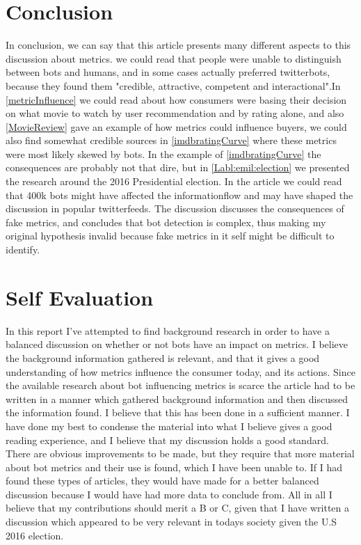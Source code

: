 \section{Conclusion}
In conclusion, we can say that this article presents many different aspects to this discussion about metrics. we could read that people were unable to distinguish between bots and humans, and in some cases actually preferred twitterbots, because they found them "credible, attractive, competent and interactional"\cite{Edwards2014372}.In \ref{metricInfluence} we could read about how consumers were basing their decision on what movie to watch by user recommendation and by rating alone, and also \ref{MovieReview} gave an example of how metrics could influence buyers, we could also find somewhat credible sources in \ref{imdbratingCurve} where these metrics were most likely skewed by bots. In the example of \ref{imdbratingCurve} the consequences are probably not that dire, but in \ref{Labl:emil:election} we presented the research around the 2016 Presidential election. In the article we could read that 400k bots might have affected the informationflow and may have shaped the discussion in popular twitterfeeds. The discussion discusses the consequences of fake metrics, and concludes that bot detection is complex, thus making my original hypothesis invalid because fake metrics in it self might be difficult to identify. 



\section*{Self Evaluation}
In this report I've attempted to find background research in order to have a balanced discussion on whether or not bots have an impact on metrics. I believe the background information gathered is relevant, and that it gives a good understanding of how metrics influence the consumer today, and its actions. Since the available research about bot influencing metrics is scarce the article had to be written in a manner which gathered background information and then discussed the information found. I believe that this has been done in a sufficient manner. I have done my best to condense the material into what I believe gives a good reading experience, and I believe that my discussion holds a good standard. There are obvious improvements to be made, but they require that more material about bot metrics and their use is found, which I have been unable to. If I had found these types of articles, they would have made for a better balanced discussion because I would have had more data to conclude from. All in all I believe that my contributions should merit a B or C, given that I have written a discussion which appeared to be very relevant in todays society given the U.S 2016 election. 


